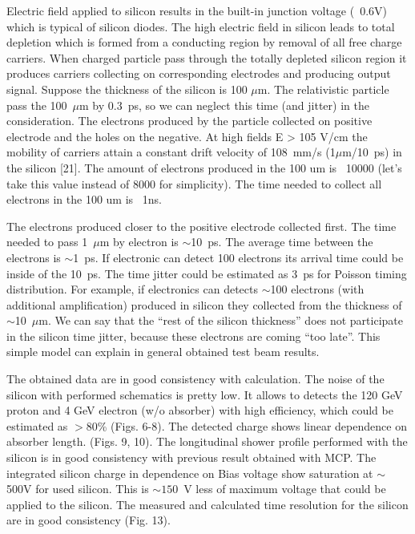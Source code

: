 \documentclass[12pt]{article}
\begin{document}
Electric field applied to silicon results in the built-in junction voltage
(~0.6V) which is typical of silicon diodes. The high electric field in silicon
leads to total depletion which is formed from a conducting region by removal of
all free charge carriers. When charged particle pass through the totally
depleted silicon region it produces carriers collecting on corresponding
electrodes and producing output signal. Suppose the thickness of the silicon is
100 $\mu$m. The relativistic particle pass the 100~$\mu$m by 0.3~ps, so we can neglect
this time (and jitter) in the consideration. The electrons produced by the
particle collected on positive electrode and the holes on the negative. At high
fields E > 105 V/cm the mobility of carriers attain a constant drift velocity of
108~mm/s (1$\mu$m/10~ps) in the silicon [21]. The amount of electrons produced in the
100 um is ~10000 (let’s take this value instead of 8000 for simplicity). The
time needed to collect all electrons in the 100 um is ~1ns. 

The electrons produced closer to the positive electrode collected first. The
time needed to pass 1~$\mu$m by electron is $\sim$10~ps. The average time between the
electrons is $\sim$1~ps. If electronic can detect 100 electrons its arrival time
could be inside of the 10~ps. The time jitter could be estimated as 3~ps for
Poisson timing distribution. For example, if electronics can detects $\sim$100
electrons (with additional amplification) produced in silicon they collected
from the thickness of $\sim$10~$\mu$m. We can say that the ``rest of the silicon
thickness'' does not participate in the silicon time jitter, because these
electrons are coming ``too late''. This simple model can explain in general
obtained test beam results.

The obtained data are in good consistency with calculation. The noise of the
silicon with performed schematics is pretty low. It allows to detects the 120
GeV proton and 4 GeV electron (w/o absorber) with high efficiency, which could
be estimated as $>80$\% (Figs. 6-8). The detected charge shows linear dependence
on absorber length. (Figs. 9, 10). The longitudinal shower profile performed
with the silicon is in good consistency with previous result obtained with MCP.
The integrated silicon charge in dependence on Bias voltage show saturation at
$\sim$500V for used silicon. This is $\sim 150$~V less of maximum voltage that could be
applied to the silicon. The measured and calculated time resolution for the
silicon are in good consistency (Fig. 13).
\end{document}
